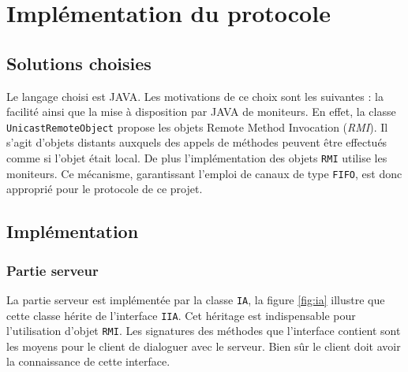 \chapter{Implémentation du protocole}

\section{Solutions choisies}
Le langage choisi est \textsc{JAVA}. Les motivations de ce choix sont les suivantes : la facilité  ainsi que la mise à disposition par \textsc{JAVA} de moniteurs. En effet, la classe \texttt{UnicastRemoteObject} propose les objets Remote Method Invocation (\textit{RMI}). Il s'agit d'objets \og distants \fg{} auxquels des appels de méthodes peuvent être effectués comme si l'objet était local. De plus  l'implémentation des objets \texttt{RMI}  utilise les moniteurs. Ce mécanisme, garantissant l'emploi de canaux de type \texttt{FIFO}, est donc approprié pour le protocole de ce projet.  

\section{Implémentation}

\subsection{Partie serveur}
La partie \og serveur \fg{} est implémentée par la classe \texttt{IA}, la figure \ref{fig:ia} illustre que cette classe hérite de l'interface \texttt{IIA}. Cet héritage est indispensable pour l'utilisation d'objet \texttt{RMI}. Les signatures des méthodes que l'interface contient sont les moyens pour le client de dialoguer avec le serveur. Bien sûr le client doit avoir la connaissance de cette interface.

